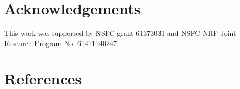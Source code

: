 \documentclass[preprint, 10pt]{elsarticle}
\begin{document}
\linenumbers











\section*{Acknowledgements}
This work was supported by NSFC grant 61373031
and NSFC-NRF Joint Research Program No. 61411140247.

\section*{References}


\end{document}
